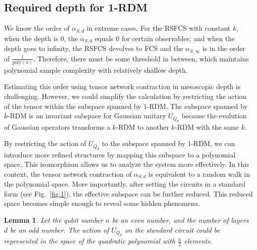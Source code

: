 \documentclass{article}
\newtheorem{lemma}{Lemma}
\begin{document}

\subsection{Required depth for 1-RDM}

We know the order of $\alpha_{S, d}$ in extreme cases. For the RSFCS with constant $k$, when the depth is $0$, the $\alpha_{S, 0}$ equals $0$ for certain observables; and when the depth goes to infinity, the RSFCS devolves to FCS and the $\alpha_{S, \infty}$ is in the order of $\frac{1}{\mathrm{poly}(n)}$. Therefore, there must be some threshold in between, which maintains polynomial sample complexity with relatively shallow depth. 

Estimating this order using tensor network contraction in mesoscopic depth is challenging. However, we could simplify the calculation by restricting the action of the tensor within the subspace spanned by $1$-RDM. The subspace spanned by $k$-RDM is an invariant subspace for Gaussian unitary $U_{Q_d}$ because the evolution of Gaussian operators transforms a $k$-RDM to another $k$-RDM with the same $k$. 

By restricting the action of $U_{Q_d}$ to the subspace spanned by $1$-RDM, we can introduce more refined structures by mapping this subspace to a polynomial space. This isomorphism allows us to analyze the system more effectively. In this context, the tensor network contraction of $\alpha_{S,d}$ is equivalent to a random walk in the polynomial space. More importantly, after setting the circuits in a standard form (see Fig.~\ref{fig:1}), the effective subspace can be further reduced. This reduced space becomes simple enough to reveal some hidden phenomena.



\begin{lemma}
    Let the qubit number $n$ be an even number, and the number of layers $d$ be an odd number. The action of $U_{Q_d}$ on the standard circuit could be represented in the space of the quadratic polynomial with $\frac{n}{2}$ elements. 
\end{lemma}
\end{document}
